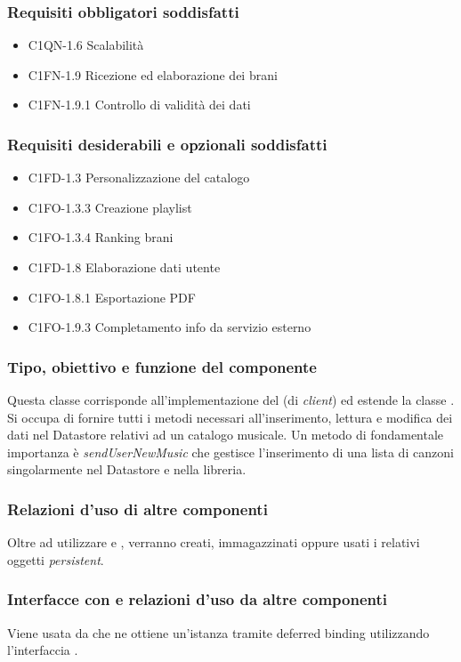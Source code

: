 \subsubsection*{Requisiti obbligatori soddisfatti}
\begin{itemize}
    \item C1QN-1.6 Scalabilit\`a
    \item C1FN-1.9 Ricezione ed elaborazione dei brani
    \item C1FN-1.9.1 Controllo di validit\`a dei dati
\end{itemize}
\subsubsection*{Requisiti desiderabili e opzionali soddisfatti}
\begin{itemize}
    \item C1FD-1.3 Personalizzazione del catalogo
    \item C1FO-1.3.3 Creazione playlist
    \item C1FO-1.3.4 Ranking brani
    \item C1FD-1.8 Elaborazione dati utente
    \item C1FO-1.8.1 Esportazione PDF
    \item C1FO-1.9.3 Completamento info da servizio esterno
\end{itemize}
\subsubsection*{Tipo, obiettivo e funzione del componente}
Questa classe corrisponde all'implementazione del  (di
\emph{client}) ed estende la classe . Si occupa di
fornire tutti i metodi necessari all'inserimento, lettura e modifica dei dati
nel Datastore relativi ad un catalogo musicale. Un
metodo di fondamentale importanza \`e
\emph{sendUserNewMusic} che gestisce l'inserimento di
una lista di canzoni singolarmente nel Datastore e nella
libreria.
\subsubsection*{Relazioni d'uso di altre componenti} Oltre ad utilizzare
 e , verranno creati, immagazzinati oppure usati
i relativi oggetti \emph{persistent}. 
\subsubsection*{Interfacce con e relazioni d'uso da altre
componenti} Viene usata da  che ne ottiene un'istanza
tramite deferred binding utilizzando l'interfaccia .
